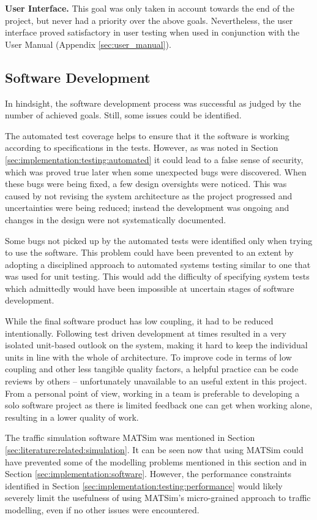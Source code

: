 \textbf{User Interface.} This goal was only taken in account towards the end of
the project, but never had a priority over the above goals. Nevertheless, the
user interface proved satisfactory in user testing when used in conjunction
with the User Manual (Appendix \ref{sec:user_manual}).


\subsection{Software Development}

In hindsight, the software development process was successful as judged by the
number of achieved goals. Still, some issues could be identified.

The automated test coverage helps to ensure that it the software is working
according to specifications in the tests. However, as was noted in Section
\ref{sec:implementation:testing:automated} it could lead to a false sense of
security, which was proved true later when some unexpected bugs were
discovered. When these bugs were being fixed, a few design oversights were
noticed. This was caused by not revising the system architecture as the project
progressed and uncertainties were being reduced; instead the development was
ongoing and changes in the design were not systematically documented.

Some bugs not picked up by the automated tests were identified only when trying
to use the software. This problem could have been prevented to an extent by
adopting a disciplined approach to automated systems testing similar to one
that was used for unit testing. This would add the difficulty of specifying
system tests which admittedly would have been impossible at uncertain stages of
software development.

While the final software product has low coupling, it had to be reduced
intentionally. Following test driven development at times resulted in a very
isolated unit-based outlook on the system, making it hard to keep the
individual units in line with the whole of architecture. To improve code in
terms of low coupling and other less tangible quality factors, a helpful
practice can be code reviews by others -- unfortunately unavailable to an
useful extent in this project. From a personal point of view, working in a team
is preferable to developing a solo software project as there is limited
feedback one can get when working alone, resulting in a lower quality of work.

The traffic simulation software MATSim was mentioned in Section
\ref{sec:literature:related:simulation}. It can be seen now that using MATSim
could have prevented some of the modelling problems mentioned in this section
and in Section \ref{sec:implementation:software}. However, the performance
constraints identified in Section \ref{sec:implementation:testing:performance}
would likely severely limit the usefulness of using MATSim's micro-grained
approach to traffic modelling, even if no other issues were encountered.


